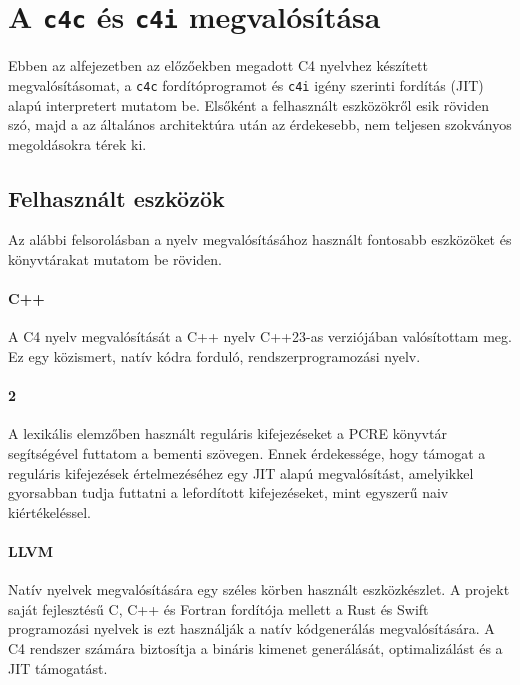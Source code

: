 \section{A {\tt c4c} és {\tt c4i} megvalósítása}\label{sec:c4:impl}

Ebben az alfejezetben az előzőekben megadott C4 nyelvhez készített megvalósításomat, a {\tt c4c} fordítóprogramot és {\tt c4i} igény szerinti fordítás (\gls{JIT}) alapú interpretert mutatom be.
Elsőként a felhasznált eszközökről esik röviden szó, majd a az általános architektúra után az érdekesebb, nem teljesen szokványos megoldásokra térek ki.

\subsection{Felhasznált eszközök}\label{subsec:c4:impl:tools}

Az alábbi felsorolásban a nyelv megvalósításához használt fontosabb eszközöket és könyvtárakat mutatom be röviden.

\paragraph{C++} A C4 nyelv megvalósítását a C++ nyelv C++23-as verziójában valósítottam meg.
Ez egy közismert, natív kódra forduló, rendszerprogramozási nyelv.

\paragraph{2 \cite{hazelPCREPerlCompatible2015}} A lexikális elemzőben használt reguláris kifejezéseket a \gls{PCRE} könyvtár segítségével futtatom a bementi szövegen.
Ennek érdekessége, hogy támogat a reguláris kifejezések értelmezéséhez egy \gls{JIT} alapú megvalósítást, amelyikkel gyorsabban tudja futtatni a lefordított kifejezéseket, mint egyszerű naiv kiértékeléssel.

\paragraph{LLVM \cite{llvmprojectLLVMCompilerInfrastructure2025}} Natív nyelvek megvalósítására egy széles körben használt eszközkészlet.
A projekt saját fejlesztésű C, C++ és Fortran fordítója mellett a Rust és Swift programozási nyelvek is ezt használják a natív kódgenerálás megvalósítására.
A C4 rendszer számára biztosítja a bináris kimenet generálását, optimalizálást és a \gls{JIT} támogatást.


